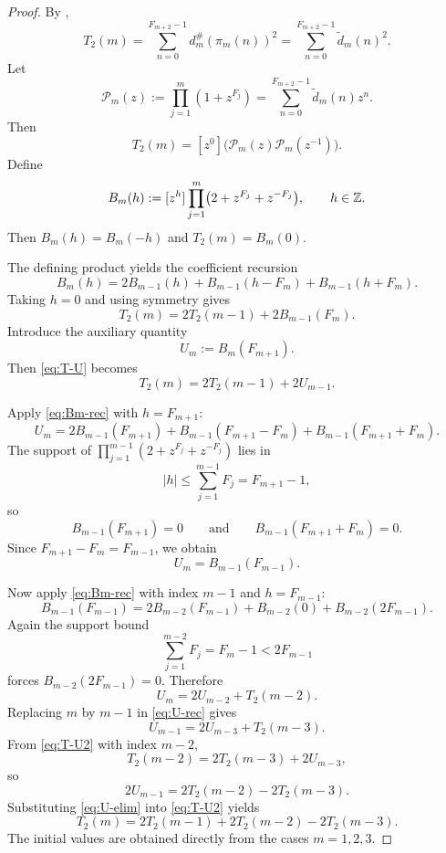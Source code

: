 \begin{proof}
By ,
\[
  T_2(m)
  =
  \sum_{n=0}^{F_{m+2}-1}d_m^\#(\pi_m(n))^2
  =
  \sum_{n=0}^{F_{m+2}-1}\widetilde d_m(n)^2.
\]
Let
\[
  \mathcal P_m(z):=\prod_{j=1}^m(1+z^{F_j})
  =
  \sum_{n=0}^{F_{m+2}-1}\widetilde d_m(n)z^n.
\]
Then
\[
  T_2(m)
  =
  [z^0]\bigl(\mathcal P_m(z)\mathcal P_m(z^{-1})\bigr).
\]
Define
\[
  B_m(h):=[z^h]\prod_{j=1}^m\bigl(2+z^{F_j}+z^{-F_j}\bigr),
  \qquad h\in\mathbb{Z}.
\]
Then \(B_m(h)=B_m(-h)\) and \(T_2(m)=B_m(0)\).

The defining product yields the coefficient recursion
\begin{equation}\label{eq:Bm-rec}
  B_m(h)=2B_{m-1}(h)+B_{m-1}(h-F_m)+B_{m-1}(h+F_m).
\end{equation}
Taking \(h=0\) and using symmetry gives
\begin{equation}\label{eq:T-U}
  T_2(m)=2T_2(m-1)+2B_{m-1}(F_m).
\end{equation}
Introduce the auxiliary quantity
\[
  U_m:=B_m(F_{m+1}).
\]
Then \eqref{eq:T-U} becomes
\begin{equation}\label{eq:T-U2}
  T_2(m)=2T_2(m-1)+2U_{m-1}.
\end{equation}

Apply \eqref{eq:Bm-rec} with \(h=F_{m+1}\):
\[
  U_m
  =
  2B_{m-1}(F_{m+1})
  +B_{m-1}(F_{m+1}-F_m)
  +B_{m-1}(F_{m+1}+F_m).
\]
The support of \(\prod_{j=1}^{m-1}(2+z^{F_j}+z^{-F_j})\) lies in
\[
  |h|\le \sum_{j=1}^{m-1}F_j=F_{m+1}-1,
\]
so
\[
  B_{m-1}(F_{m+1})=0
  \qquad\text{and}\qquad
  B_{m-1}(F_{m+1}+F_m)=0.
\]
Since \(F_{m+1}-F_m=F_{m-1}\), we obtain
\begin{equation}\label{eq:U-shift}
  U_m=B_{m-1}(F_{m-1}).
\end{equation}

Now apply \eqref{eq:Bm-rec} with index \(m-1\) and \(h=F_{m-1}\):
\[
  B_{m-1}(F_{m-1})
  =
  2B_{m-2}(F_{m-1})
  +B_{m-2}(0)
  +B_{m-2}(2F_{m-1}).
\]
Again the support bound
\[
  \sum_{j=1}^{m-2}F_j=F_m-1<2F_{m-1}
\]
forces \(B_{m-2}(2F_{m-1})=0\).  Therefore
\begin{equation}\label{eq:U-rec}
  U_m=2U_{m-2}+T_2(m-2).
\end{equation}
Replacing \(m\) by \(m-1\) in \eqref{eq:U-rec} gives
\[
  U_{m-1}=2U_{m-3}+T_2(m-3).
\]
From \eqref{eq:T-U2} with index \(m-2\),
\[
  T_2(m-2)=2T_2(m-3)+2U_{m-3},
\]
so
\begin{equation}\label{eq:U-elim}
  2U_{m-1}=2T_2(m-2)-2T_2(m-3).
\end{equation}
Substituting \eqref{eq:U-elim} into \eqref{eq:T-U2} yields
\[
  T_2(m)=2T_2(m-1)+2T_2(m-2)-2T_2(m-3).
\]
The initial values are obtained directly from the cases \(m=1,2,3\).
\end{proof}

